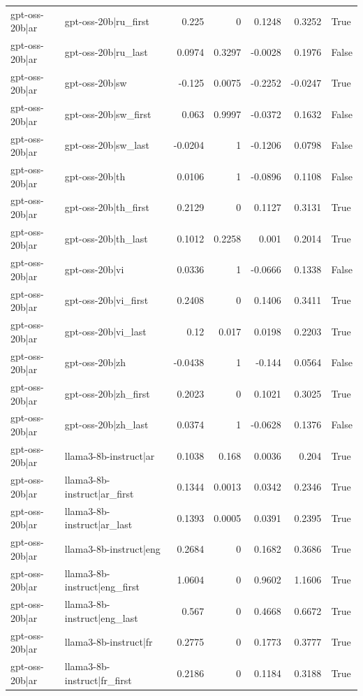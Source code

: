 \begin{table}
\begin{tabular}{l l r r r r l}
gpt-oss-20b|ar & gpt-oss-20b|ru_first & 0.225 & 0 & 0.1248 & 0.3252 & True \\
gpt-oss-20b|ar & gpt-oss-20b|ru_last & 0.0974 & 0.3297 & -0.0028 & 0.1976 & False \\
gpt-oss-20b|ar & gpt-oss-20b|sw & -0.125 & 0.0075 & -0.2252 & -0.0247 & True \\
gpt-oss-20b|ar & gpt-oss-20b|sw_first & 0.063 & 0.9997 & -0.0372 & 0.1632 & False \\
gpt-oss-20b|ar & gpt-oss-20b|sw_last & -0.0204 & 1 & -0.1206 & 0.0798 & False \\
gpt-oss-20b|ar & gpt-oss-20b|th & 0.0106 & 1 & -0.0896 & 0.1108 & False \\
gpt-oss-20b|ar & gpt-oss-20b|th_first & 0.2129 & 0 & 0.1127 & 0.3131 & True \\
gpt-oss-20b|ar & gpt-oss-20b|th_last & 0.1012 & 0.2258 & 0.001 & 0.2014 & True \\
gpt-oss-20b|ar & gpt-oss-20b|vi & 0.0336 & 1 & -0.0666 & 0.1338 & False \\
gpt-oss-20b|ar & gpt-oss-20b|vi_first & 0.2408 & 0 & 0.1406 & 0.3411 & True \\
gpt-oss-20b|ar & gpt-oss-20b|vi_last & 0.12 & 0.017 & 0.0198 & 0.2203 & True \\
gpt-oss-20b|ar & gpt-oss-20b|zh & -0.0438 & 1 & -0.144 & 0.0564 & False \\
gpt-oss-20b|ar & gpt-oss-20b|zh_first & 0.2023 & 0 & 0.1021 & 0.3025 & True \\
gpt-oss-20b|ar & gpt-oss-20b|zh_last & 0.0374 & 1 & -0.0628 & 0.1376 & False \\
gpt-oss-20b|ar & llama3-8b-instruct|ar & 0.1038 & 0.168 & 0.0036 & 0.204 & True \\
gpt-oss-20b|ar & llama3-8b-instruct|ar_first & 0.1344 & 0.0013 & 0.0342 & 0.2346 & True \\
gpt-oss-20b|ar & llama3-8b-instruct|ar_last & 0.1393 & 0.0005 & 0.0391 & 0.2395 & True \\
gpt-oss-20b|ar & llama3-8b-instruct|eng & 0.2684 & 0 & 0.1682 & 0.3686 & True \\
gpt-oss-20b|ar & llama3-8b-instruct|eng_first & 1.0604 & 0 & 0.9602 & 1.1606 & True \\
gpt-oss-20b|ar & llama3-8b-instruct|eng_last & 0.567 & 0 & 0.4668 & 0.6672 & True \\
gpt-oss-20b|ar & llama3-8b-instruct|fr & 0.2775 & 0 & 0.1773 & 0.3777 & True \\
gpt-oss-20b|ar & llama3-8b-instruct|fr_first & 0.2186 & 0 & 0.1184 & 0.3188 & True \\

\end{tabular}
\end{table}
